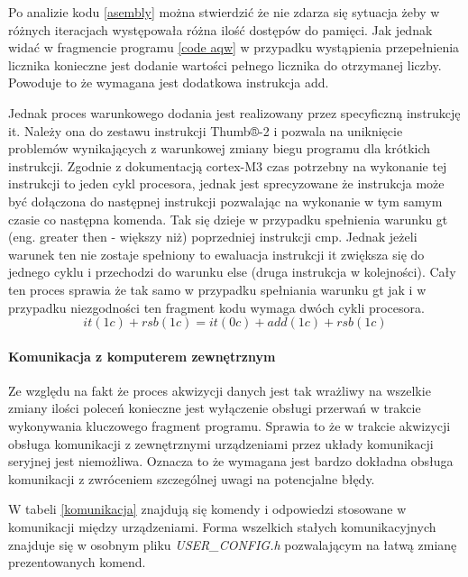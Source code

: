 \documentclass[a4paper,12pt]{article}
\begin{document}
\begin{kod}
        Assembler},firstline=30, lastline=48]{code_source/asembler/loop_final.S}
        \caption{Fragment kodu asemblera utworzonego przez kompilację części kodu \ref{code aqw}. }
        \label{asembly}
\end{kod}

Po analizie kodu \ref{asembly} można stwierdzić że nie zdarza się sytuacja żeby w różnych iteracjach występowała różna ilość dostępów do pamięci.
Jak jednak widać w fragmencie programu \ref{code aqw} w przypadku wystąpienia przepełnienia licznika konieczne jest dodanie wartości pełnego licznika do otrzymanej liczby. 
Powoduje to że wymagana jest dodatkowa instrukcja add.

Jednak proces warunkowego dodania jest realizowany przez specyficzną instrukcję it.
Należy ona do zestawu instrukcji Thumb®-2 i pozwala na uniknięcie problemów wynikających z warunkowej zmiany biegu programu dla krótkich instrukcji. 
Zgodnie z dokumentacją\cite{cycles} cortex-M3 czas potrzebny na wykonanie tej instrukcji to jeden cykl procesora, jednak jest sprecyzowane że instrukcja może być dołączona do następnej instrukcji pozwalając na wykonanie w tym samym czasie co następna komenda.
Tak się dzieje w przypadku spełnienia warunku gt (eng. greater then - większy niż) poprzedniej instrukcji cmp. Jednak jeżeli warunek ten nie zostaje spełniony to ewaluacja instrukcji it zwiększa się do jednego cyklu i przechodzi do warunku else (druga instrukcja w kolejności).
Cały ten proces sprawia że tak samo w przypadku spełniania warunku gt jak i w przypadku niezgodności ten fragment kodu wymaga dwóch cykli procesora.
$$it(1c) + rsb(1c) = it(0c) + add(1c) + rsb(1c)$$

\paragraph{Komunikacja z komputerem zewnętrznym}
Ze względu na fakt że proces akwizycji danych jest tak wrażliwy na wszelkie zmiany ilości poleceń konieczne jest wyłączenie obsługi przerwań w trakcie wykonywania kluczowego fragment programu. 
Sprawia to że w trakcie akwizycji obsługa komunikacji z zewnętrznymi urządzeniami przez układy komunikacji seryjnej jest niemożliwa. 
Oznacza to że wymagana jest bardzo dokładna obsługa komunikacji z zwróceniem szczególnej uwagi na potencjalne błędy. 

W tabeli \ref{komunikacja} znajdują się komendy i odpowiedzi stosowane w komunikacji między urządzeniami. 
Forma wszelkich stałych komunikacyjnych znajduje się w osobnym pliku \textit{USER\_CONFIG.h} pozwalającym na łatwą zmianę prezentowanych komend.
\end{document}
